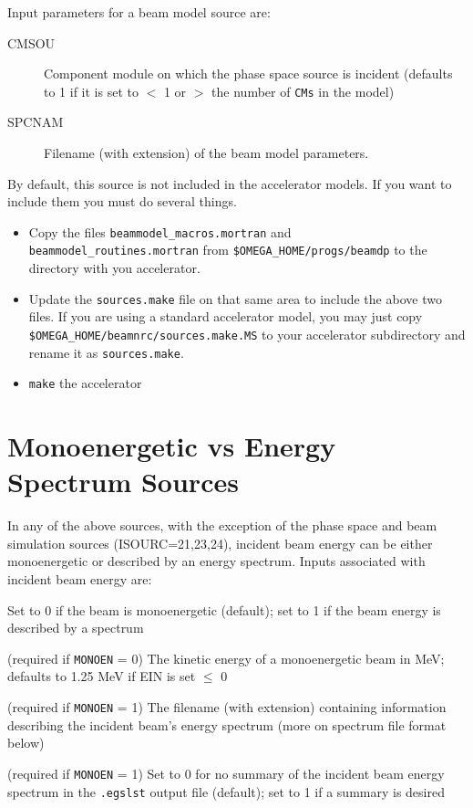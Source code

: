 \documentclass[12pt,twoside]{article}
\begin{document}
Input parameters for a beam model source are:

\begin{description}
\item [CMSOU] Component module on which the phase space source is
incident (defaults to 1 if it is set to $<$ 1 or $>$ the number of
\verb+CMs+
in the model)
\item [SPCNAM] Filename (with extension) of the beam model parameters.
\end{description}

By default, this source is not included in the accelerator models. If you
want to include them you must do several things.
\begin{itemize}
\item Copy the files {\tt beammodel\_macros.mortran} and {\tt
beammodel\_routines.mortran} from {\tt \$OMEGA\_HOME/progs/beamdp} to the
directory with you accelerator.

\item Update the {\tt sources.make} file on that same area to include the
above two files.  If you are using a standard accelerator model, you may
just copy {\tt \$OMEGA\_HOME/beamnrc/sources.make.MS} to your accelerator
subdirectory and rename it as {\tt sources.make}.

\item {\tt make} the accelerator
\end{itemize}



\newpage
\section{Monoenergetic vs Energy Spectrum Sources}
  

In any of the above sources, with the exception of the phase space and beam simulation
sources (ISOURC=21,23,24), incident beam energy can be either monoenergetic or described by an energy
spectrum.  Inputs associated with incident beam energy are:

\begin{description}

\item [MONOEN] Set to 0 if the beam is monoenergetic (default); set to 1
if the beam energy is described by a spectrum
\item [EIN] (required if \verb+MONOEN+ = 0) The kinetic energy of a monoenergetic beam in MeV; defaults
to 1.25 MeV if EIN is set $\leq$ 0
\item [FILNAM] (required if \verb+MONOEN+ = 1) The filename (with extension)
containing information describing the incident beam's energy spectrum
(more on spectrum file format below)
\item [IOUTSP] (required if \verb+MONOEN+ = 1) Set to 0 for no summary of the
incident beam energy spectrum in the \verb+.egslst+ output file
(default); set to 1 if a summary is desired
\end{description}
\end{document}
